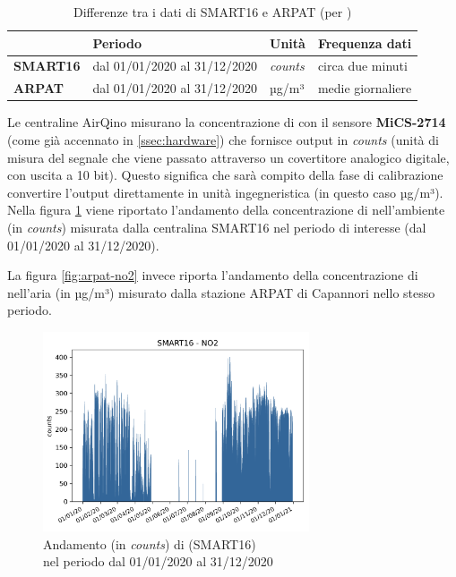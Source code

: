 \begin{table}[H]
\centering
\def\arraystretch{0.9}
\begin{tabular}{|l|l|l|l|}
\cline{2-4}
\multicolumn{1}{c|}{} & \textbf{Periodo} & \textbf{Unità} & \textbf{Frequenza dati} \\ \hline
\textbf{SMART16} & dal 01/01/2020 al 31/12/2020 & \textit{counts} & circa due minuti \\ \hline
\textbf{ARPAT} & dal 01/01/2020 al 31/12/2020 & µg/m³ & medie giornaliere \\ \hline
\end{tabular}
\captionsetup{justification=centering}
\caption{Differenze tra i dati di SMART16 e ARPAT (per )}
\label{tab:dataset-no2-tabella}
\end{table}

Le centraline AirQino misurano la concentrazione di  con il sensore \textbf{MiCS-2714} (come già accennato in \ref{ssec:hardware}) che fornisce output in \textit{counts} (unità di misura del segnale che viene passato attraverso un covertitore analogico digitale, con uscita a 10 bit). Questo significa che sarà compito della fase di calibrazione convertire l'output direttamente in unità ingegneristica (in questo caso µg/m³).\\

Nella figura \ref{fig:smart16-no2} viene riportato l'andamento della concentrazione di  nell'ambiente (in \textit{counts}) misurata dalla centralina SMART16 nel periodo di interesse (dal 01/01/2020 al 31/12/2020).

La figura \ref{fig:arpat-no2} invece riporta l'andamento della concentrazione di  nell'aria (in µg/m³) misurato dalla stazione ARPAT di Capannori nello stesso periodo.

\begin{figure}[H]
\centering
\captionsetup{justification=centering}
\includegraphics[width=0.70\textwidth,height=\textheight,keepaspectratio]{img/smart16_no2}
\caption{Andamento (in \textit{counts}) di  (SMART16)\\nel periodo dal 01/01/2020 al 31/12/2020}
\label{fig:smart16-no2}
\end{figure}

